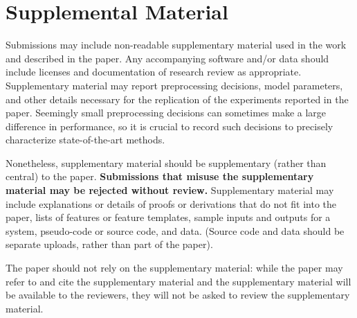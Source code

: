 \documentclass[11pt,a4paper]{article}
\begin{document}
\section{Supplemental Material}
\label{sec:supplemental}
Submissions may include non-readable supplementary material used in the work and described in the paper. Any accompanying software and/or data should include licenses and documentation of research review as appropriate. Supplementary material may report preprocessing decisions, model parameters, and other details necessary for the replication of the experiments reported in the paper. Seemingly small preprocessing decisions can sometimes make a large difference in performance, so it is crucial to record such decisions to precisely characterize state-of-the-art methods. 

Nonetheless, supplementary material should be supplementary (rather
than central) to the paper. \textbf{Submissions that misuse the supplementary 
material may be rejected without review.}
Supplementary material may include explanations or details of proofs or derivations that do not fit into the paper, lists of features or feature templates, sample inputs and outputs for a system,
pseudo-code or source code, and data. (Source code and data should
be separate uploads, rather than part of the paper).

The paper should not rely on the supplementary material: while the paper
may refer to and cite the supplementary material and the supplementary material will be available to the
reviewers, they will not be asked to review the
supplementary material.
\end{document}
